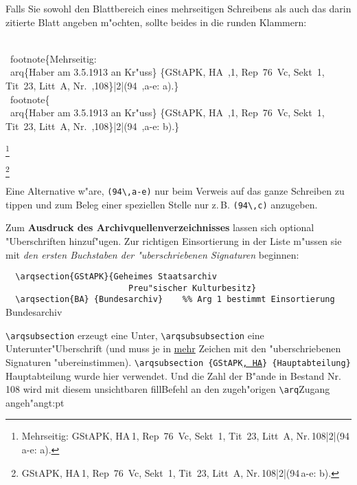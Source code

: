 \documentclass[12pt,a4paper]{article}
\newcommand{\pdfko}[1]{\kern #1pt
                          \strut\ignorespaces}%
\newcommand{\pbs}{\string\ \unskip}
\newcommand{\bs}{\protect\pbs}
\begin{document}
\vspace{-.25ex}\vfill\noindent
Falls Sie sowohl den Blattbereich eines mehrseitigen Schreibens als auch 
das darin zitierte Blatt angeben m"ochten, sollte beides in die runden Klammern:

\newpage
\Doppelbox
{\strut\\[-2ex]
\bs footnote\{Mehrseitig: 
\\ \bs arq\{Haber am 3.5.1913 an Kr"uss\} \{GStAPK, HA\bs ,1, 
Rep\string~76\string~Vc, Sekt\string~1, Tit\string~23, Litt\string~A, 
Nr.\bs ,108\}\string|2\string|(94\bs ,a-e: a).\}
\\[1.5ex]
\bs footnote\{
\\ \bs arq\{Haber am 3.5.1913 an Kr"uss\} \{GStAPK, HA\bs ,1, 
Rep\string~76\string~Vc, Sekt\string~1, Tit\string~23, Litt\string~A, 
Nr.\bs ,108\}\string|2\string|(94\bs ,a-e: b).\}
\\[-2.25ex]\strut
}
{
\footnote{Mehrseitig: 
 {GStAPK, HA\,1, 
Rep~76~Vc, Sekt~1, Tit~23, Litt~A, Nr.\,108}|2|(94\,a-e: a).}

\footnote{
 {GStAPK, HA\,1, 
Rep~76~Vc, Sekt~1, Tit~23, Litt~A, Nr.\,108}|2|(94\,a-e: b).}
}

\noindent
Eine Alternative w"are, \verb|(94\,a-e)| nur beim Verweis auf das 
ganze Schreiben zu tippen und zum Beleg einer speziellen Stelle
nur z.\,B. \verb|(94\,c)| anzugeben.

\vspace{1ex}\noindent
Zum \textbf{Ausdruck des Archivquellenverzeichnisses} lassen sich 
optional "Uberschriften hinzuf"ugen. Zur richtigen Einsortierung 
in der Liste m"ussen sie mit \textit{den ersten Buchstaben
der "uberschriebenen Signaturen} beginnen:

\vspace{1.25ex}
{\small
\verb|  \arqsection{GStAPK}{Geheimes Staatsarchiv|\\
\verb|                         Preu|\texttt{"s}\verb|ischer Kulturbesitz}|\\
\verb|  \arqsection{BA} {Bundesarchiv}    %% Arg 1 bestimmt Einsortierung|
}
   {Bundesarchiv}    %

\vspace{1.5ex}\noindent
\verb|\arqsubsection| erzeugt eine Unter\fhy,
\verb|\arqsubsubsection| eine Unterunter\hy "Uberschrift
(und muss je in \underline{mehr} Zeichen mit den "uberschriebenen 
Signaturen "ubereinstimmen). 
\verb|\arqsubsection {GStAPK|\underline{\texttt{, HA}}\verb|} {Hauptabteilung}|
 {Hauptabteilung} wurde hier verwendet. 
Und die Zahl der B"ande in Bestand Nr.\,108 wird mit diesem
unsichtbaren fill\hy Befehl an den zugeh"origen \verb|\arq|\hy Zugang angeh"angt:\pdfko{1}
\end{document}
